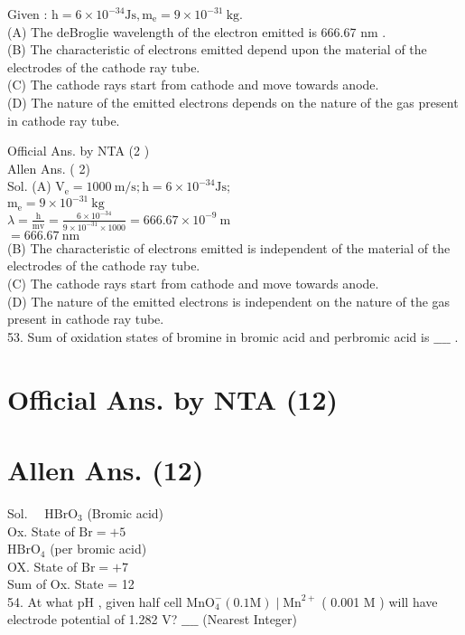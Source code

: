\documentclass[10pt]{article}
\begin{document}
Given : \(\mathrm{h}=6 \times 10^{-34} \mathrm{Js}, \mathrm{m}_{\mathrm{e}}=9 \times 10^{-31} \mathrm{~kg}\).\\
(A) The deBroglie wavelength of the electron emitted is 666.67 nm .\\
(B) The characteristic of electrons emitted depend upon the material of the electrodes of the cathode ray tube.\\
(C) The cathode rays start from cathode and move towards anode.\\
(D) The nature of the emitted electrons depends on the nature of the gas present in cathode ray tube.

Official Ans. by NTA (2 )\\
Allen Ans. ( 2)\\
Sol. (A) \(\mathrm{V}_{\mathrm{e}}=1000 \mathrm{~m} / \mathrm{s} ; \mathrm{h}=6 \times 10^{-34} \mathrm{Js}\);\\
\(\mathrm{m}_{\mathrm{e}}=9 \times 10^{-31} \mathrm{~kg}\)\\
\(\lambda=\frac{\mathrm{h}}{\mathrm{mv}}=\frac{6 \times 10^{-34}}{9 \times 10^{-31} \times 1000}=666.67 \times 10^{-9} \mathrm{~m}\)\\
\(=666.67 \mathrm{~nm}\)\\
(B) The characteristic of electrons emitted is independent of the material of the electrodes of the cathode ray tube.\\
(C) The cathode rays start from cathode and move towards anode.\\
(D) The nature of the emitted electrons is independent on the nature of the gas present in cathode ray tube.\\
53. Sum of oxidation states of bromine in bromic acid and perbromic acid is \(\_\_\_\_\) .

\section*{Official Ans. by NTA (12)}
\section*{Allen Ans. (12)}
Sol. \(\quad \mathrm{HBrO}_{3}\) (Bromic acid)\\
Ox. State of \(\mathrm{Br}=+5\)\\
\(\mathrm{HBrO}_{4}\) (per bromic acid)\\
OX. State of \(\mathrm{Br}=+7\)\\
Sum of Ox. State = 12\\
54. At what pH , given half cell \(\mathrm{MnO}_{4}^{-}(0.1 \mathrm{M}) \mid \mathrm{Mn}^{2+}\) ( 0.001 M ) will have electrode potential of 1.282 V? \(\_\_\_\_\) (Nearest Integer)
\end{document}
